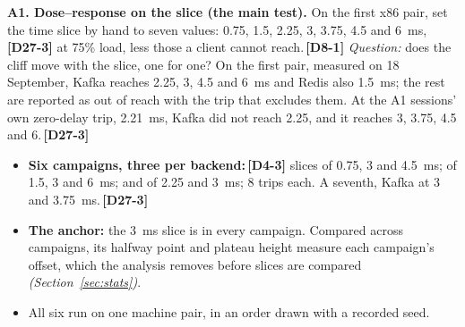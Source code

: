 \documentclass[11pt]{article}
\newcommand{\gl}[1]{{\color{soft}\itshape\small (#1)}}
\newcommand{\chgold}[1]{\,{\color{oldcol}\bfseries\footnotesize[#1]}}
\begin{document}
\textbf{A1. Dose--response on the slice (the main test).} On the first x86 pair, set the time slice by hand to seven values: 0.75, 1.5, 2.25, 3, 3.75, 4.5 and 6~ms,\chgold{D27-3} at 75\% load, less those a client cannot reach.\chgold{D8-1} \emph{Question:} does the cliff move with the slice, one for one? On the first pair, measured on 18 September, Kafka reaches 2.25, 3, 4.5 and 6~ms and Redis also 1.5~ms; the rest are reported as out of reach with the trip that excludes them. At the A1 sessions' own zero-delay trip, 2.21~ms, Kafka did not reach 2.25, and it reaches 3, 3.75, 4.5 and 6.\chgold{D27-3}
\begin{itemize}
  \item \textbf{Six campaigns, three per backend:}\chgold{D4-3} slices of 0.75, 3 and 4.5~ms; of 1.5, 3 and 6~ms; and of 2.25 and 3~ms; 8 trips each. A seventh, Kafka at 3 and 3.75~ms.\chgold{D27-3}
  \item \textbf{The anchor:} the 3~ms slice is in every campaign. Compared across campaigns, its halfway point and plateau height measure each campaign's offset, which the analysis removes before slices are compared \gl{Section~\ref{sec:stats}}.
  \item All six run on one machine pair, in an order drawn with a recorded seed.
\end{itemize}
\end{document}
